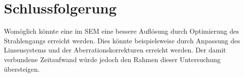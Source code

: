 \newpage
\section{Schlussfolgerung}

	Womöglich könnte eine im SEM eine bessere Auflösung durch Optimierung des Strahlengangs erreicht werden.
	Dies könnte beispielsweise durch Anpassung des Linsensystems und der Aberrationskorrekturen erreicht werden.
	Der damit verbundene Zeitaufwand würde jedoch den Rahmen dieser Untersuchung übersteigen.
